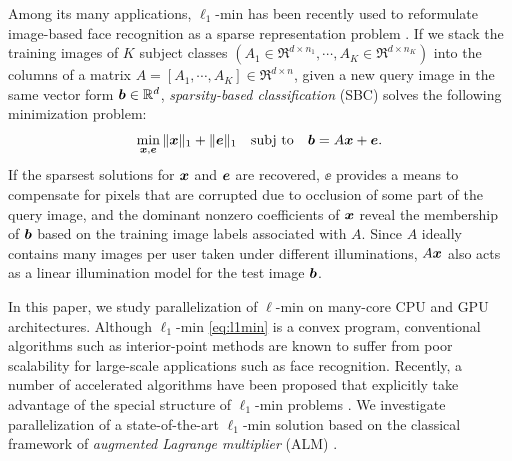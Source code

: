 \documentclass[10pt,twocolumn,letterpaper]{article}
\begin{document}
Among its many applications, $\ell_1$-min has been recently used to reformulate
image-based face recognition as a sparse representation problem
\cite{WrightJ2009-PAMI}.  If we stack the training images of $K$ subject
classes $(A_1\in\Re^{d\times n_1}, \cdots, A_K\in\Re^{d\times n_K})$ into the
columns of a matrix $A = [A_1, \cdots, A_K]\in\Re^{d\times n}$, given a new
query image in the same vector form ${\boldsymbol{b}}\in{\mathbb{R}}^d$, \emph{sparsity-based
classification} (SBC) solves the following minimization problem:
\begin{equation}
\min_{{\boldsymbol{x}}, {\boldsymbol{e}}} \| {\boldsymbol{x}} \|_1 + \|{\boldsymbol{e}}\|_1 \quad \textup{subj to} \quad {\boldsymbol{b}} = A {\boldsymbol{x}} + {\boldsymbol{e}}.
\label{eq:l1min_denoise}
\end{equation}
If the sparsest solutions for ${\boldsymbol{x}}$ and $\boldsymbol{e}$ are recovered, $\ee$ provides a
means to compensate for pixels that are corrupted due to occlusion of some part of the query
image, and the dominant nonzero coefficients of ${\boldsymbol{x}}$ reveal the membership of
${\boldsymbol{b}}$ based on the training image labels associated with $A$.  Since $A$ ideally
contains many images per user taken under different illuminations, 
$A{\boldsymbol{x}}$ also acts as a linear illumination model for the test image ${\boldsymbol{b}}$.

In this paper, we study parallelization of $\ell$-min on many-core CPU and GPU
architectures. Although $\ell_1$-min \eqref{eq:l1min} is a convex
program, conventional algorithms such as interior-point methods
\cite{ChenS2001-SIAM,TibshiraniR1996} are known to suffer from poor scalability
for large-scale applications such as face recognition. Recently, a number of
accelerated algorithms have been proposed that explicitly take advantage of
the special structure of $\ell_1$-min problems
\cite{LorisI2009,YangA2010-ICIP}. We investigate parallelization of a
state-of-the-art $\ell_1$-min solution based on the classical framework of
\emph{augmented Lagrange multiplier} (ALM) \cite{BertsekasD2003,YangA2010-ICIP}.
\end{document}
